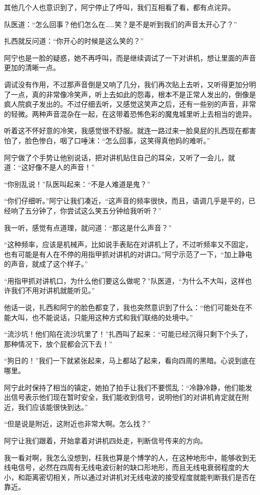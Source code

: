 其他几个人也意识到了，阿宁停止了呼叫，我们互相看了看，都有点诧异。

队医道：“怎么回事？他们怎么在……笑？是不是听到我们的声音太开心了？”

扎西就反问道：“你开心的时候是这么笑的？”

阿宁也是一脸的疑惑，她不再呼叫，而是继续调试了一下对讲机，想让里面的声音更加的清晰一点。

调试没有作用，不过那声音倒是又响了几分，我们再次贴上去听，又听得更加分明了一点，真的非常像冷笑声，听上去如此的怨毒，根本不是正常人发出的，倒像是疯人院疯子发出的。不过仔细去听，又感觉这笑声之后，还有一些别的声音，非常的轻微。两种声音混杂在一起，在这带着恐怖色彩的魔鬼城里听上去相当的诡异。

听着这不怀好意的冷笑，我感觉很不舒服。就连一路过来一脸臭屁的扎西现在都害怕了，脸色惨白，咽了口唾沫：“怎么回事，这笑得真他妈的难听。”

阿宁做了个手势让他别说话，把对讲机贴住自己的耳朵，又听了一会儿，就道：“这好像不是人的声音！”

“你别乱说！”队医叫起来：“不是人难道是鬼？”

“你们仔细听。”阿宁让我们凑近，“这声音的频率很快，而且，语调几乎是平的，已经响了五分钟了，你尝试这么笑五分钟给我听听？”

我一听，感觉有点道理，就问道：“那这是什么声音？”

“这种频率，应该是机械声，比如说手表贴在对讲机上了，不过听频率又不固定，也有可能是有人在不停的用指甲抓对讲机的对讲口。”阿宁示范了一下，“加上静电的声音，就成了这个样子。”

“用指甲抓对讲机口，为什么他们要这么做呢？”队医道，“为什么不大叫，这样也许我们不用对讲机就能听见。”

他话一说，扎西和阿宁的脸色都变了，我也突然意识到了什么：“他们可能处在不能大叫，也不能说话，只能用这种方式和我们联络的处境中。”

“流沙坑！他们陷在流沙坑里了！”扎西叫了起来：“可能已经沉得只剩下个头了，那种情况下，放个屁都会沉下去！”

“狗日的！”我们一下就紧张起来，马上都站了起来，看向四周的黑暗。心说到底在哪里。

阿宁此时保持了相当的镇定，她拍了拍手让我们不要慌乱：“冷静冷静，他们能发出信号表示他们现在暂时安全，我们能收到信号，说明他们的对讲机肯定就在附近，我们应该能很快到达。”

“但是说是附近，这附近也非常大啊。怎么找？”

阿宁让我们跟着，开始拿着对讲机四处走，判断信号传来的方向。

我一看对啊，我怎么没想到，枉我也算是个博学的人，在这种地形中，能够收到无线电信号，必然在四周有无线电波衍射的缺口形地形，而且无线电衰弱程度的大小，和距离密切相关，所以通过对讲机对无线电波的接受程度就能判断我们是否在靠近。

